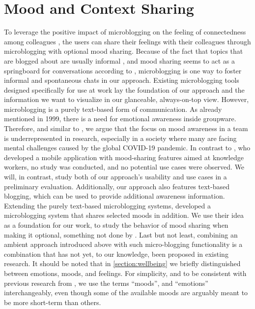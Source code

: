 \section{Mood and Context Sharing}
To leverage the positive impact of microblogging on the feeling of connectedness among colleagues \autocite{dullemond2013fixing}, the users can share their feelings with their colleagues through microblogging with optional mood sharing. Because of the fact that topics that are blogged about are usually informal \autocite{ehrlich2010microblogging}, and mood sharing seems to act as a springboard for conversations according to \textcite{church2010study}, microblogging is one way to foster informal and spontaneous chats in our approach. Existing microblogging tools designed specifically for use at work lay the foundation of our approach and the information we want to visualize in our glanceable, always-on-top view. However, microblogging is a purely text-based form of communication. As \textcite{garcia1999emotional} already mentioned in 1999, there is a need for emotional awareness inside groupware. Therefore, and similar to \autocite{mora2011supporting}, we argue that the focus on mood awareness in a team is underrepresented in research, especially in a society where many are facing mental challenges caused by the global COVID-19 pandemic. In contrast to \textcite{saari2008mobile}, who developed a mobile application with mood-sharing features aimed at knowledge workers, no study was conducted, and no potential use cases were observed. We will, in contrast, study both of our approach's usability and use cases in a preliminary evaluation. Additionally, our approach also features text-based blogging, which can be used to provide additional awareness information. Extending the purely text-based microblogging systems, \textcite{dullemond2013fixing} developed a microblogging system that shares selected moods in addition. We use their idea as a foundation for our work, to study the behavior of mood sharing when making it optional, something not done by \textcite{dullemond2013fixing}. Last but not least, combining an ambient approach introduced above with such micro-blogging functionality is a combination that has not yet, to our knowledge, been proposed in existing research. It should be noted that in \autoref{section:wellbeing} we briefly distinguished between emotions, moods, and feelings. For simplicity, and to be consistent with previous research from \textcite{dullemond2013fixing}, we use the terms \enquote{moods}, and \enquote{emotions} interchangeably, even though some of the available moods are arguably meant to be more short-term than others.


